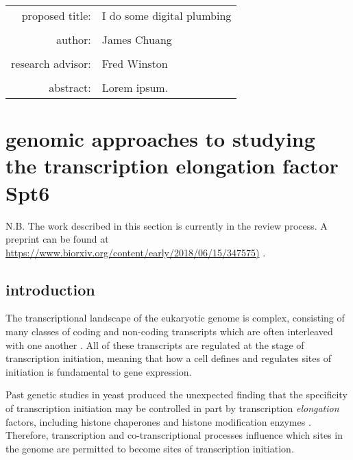 \documentclass[11pt, a4paper]{article}
\begin{document}
\begin{titlepage}
\begin{tabular}{ r l }
 proposed title:   & I do some digital plumbing \\
 		   & \\
 author:	   & James Chuang \\
 		   & \\
 research advisor: & Fred Winston \\
 		   & \\
 abstract:	   & Lorem ipsum.
\end{tabular}
\end{titlepage}

\tableofcontents

\section{genomic approaches to studying the transcription elongation factor Spt6}

N.B. The work described in this section is currently in the review process. A preprint can be found at \url{https://www.biorxiv.org/content/early/2018/06/15/347575)} \cite{doris2018}.

\subsection{introduction}

The transcriptional landscape of the eukaryotic genome is complex, consisting of many classes of coding and non-coding transcripts which are often interleaved with one another \cite{jensen2013, pelechano2017}. All of these transcripts are regulated at the stage of transcription initiation, meaning that how a cell defines and regulates sites of initiation is fundamental to gene expression.

Past genetic studies in yeast produced the unexpected finding that the specificity of transcription initiation may be controlled in part by transcription \textit{elongation} factors, including histone chaperones and histone modification enzymes \cite{kaplan2003, cheung2008, hennig2013}. Therefore, transcription and co-transcriptional processes influence which sites in the genome are permitted to become sites of transcription initiation. 
\end{document}
